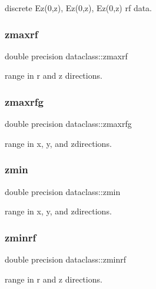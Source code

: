 discrete Ez(0,z), Ez\textquotesingle{}(0,z), Ez\textquotesingle{}\textquotesingle{}(0,z) rf data. 

\mbox{\label{namespacedataclass_a4646788256b1b461413c546d6df8ee88}} 
\subsubsection{\texorpdfstring{zmaxrf}{zmaxrf}}
{\footnotesize\ttfamily double precision dataclass\+::zmaxrf}



range in r and z directions. 

\mbox{\label{namespacedataclass_a52b6a1ee39c205fce4ef2be72ab153aa}} 
\subsubsection{\texorpdfstring{zmaxrfg}{zmaxrfg}}
{\footnotesize\ttfamily double precision dataclass\+::zmaxrfg}



range in x, y, and zdirections. 

\mbox{\label{namespacedataclass_a9c2398fd87701d5c0de37ff6b3357a0c}} 
\subsubsection{\texorpdfstring{zmin}{zmin}}
{\footnotesize\ttfamily double precision dataclass\+::zmin}



range in x, y, and zdirections. 

\mbox{\label{namespacedataclass_a24985c63a3d2c04ccb2cf299eff0c626}} 
\subsubsection{\texorpdfstring{zminrf}{zminrf}}
{\footnotesize\ttfamily double precision dataclass\+::zminrf}



range in r and z directions. 

